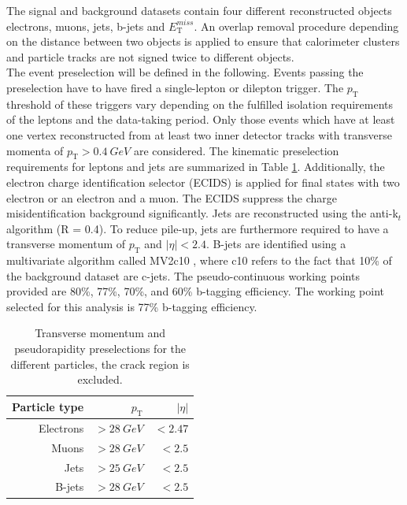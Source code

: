 The signal and background datasets contain four different reconstructed objects electrons, muons, jets, b-jets and $E_{\text{T}}^{miss}$. An overlap removal procedure depending on the distance between two objects is applied to ensure that calorimeter clusters and particle tracks are not signed twice to different objects. \\
The event preselection will be defined in the following. Events passing the preselection have to have fired a single-lepton or dilepton trigger. The $p_{\text{T}}$ threshold of these triggers vary depending on the fulfilled isolation requirements of the leptons and the data-taking period. Only those events which have at least one vertex reconstructed from at least two inner detector tracks with transverse momenta of $p_{\text{T}}>\SI{0.4}{GeV}$ are considered. The kinematic preselection requirements for leptons and jets are summarized in Table \ref{tab:requirements}. Additionally, the electron charge identification selector (ECIDS) \cite{ECIDS} is applied for final states with two electron or an electron and a muon. The ECIDS suppress the charge misidentification background significantly. Jets are reconstructed using the anti-k$_{t}$ algorithm \cite{Akt} (R = 0.4). To reduce pile-up, jets are furthermore required to have a transverse momentum of $p_{\text{T}}$ and $|\eta| < 2.4$. B-jets are identified using a multivariate algorithm called MV2c10 \cite{MV2c10} , where c10 refers to the fact that 10\% of the background dataset are c-jets. The pseudo-continuous working points provided are 80\%, 77\%, 70\%, and 60\% b-tagging efficiency. The working point selected for this analysis is 77\% b-tagging efficiency.
 
\begin{table}[H]
\centering
\begin{tabular}{|r|r|r|}
\toprule
Particle type & $p_{\text{T}}$ & $|\eta|$ \\
\midrule
\midrule
Electrons & $> \SI{28}{GeV}$ & $<2.47$ \\
Muons & $> \SI{28}{GeV}$ & $<2.5$ \\
Jets & $> \SI{25}{GeV}$ & $<2.5$ \\
B-jets & $> \SI{28}{GeV}$ & $<2.5$ \\
\bottomrule
\end{tabular}
\caption{Transverse momentum and pseudorapidity preselections for the different particles, the crack region is excluded.}
\label{tab:requirements}
\end{table}


